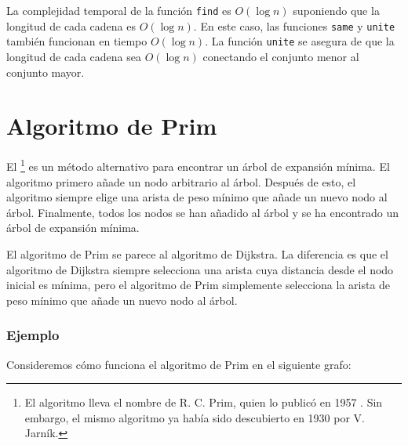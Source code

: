 La complejidad temporal de la función \texttt{find}
es $O(\log n)$ suponiendo que la longitud de cada
cadena es $O(\log n)$.
En este caso, las funciones \texttt{same} y \texttt{unite}
también funcionan en tiempo $O(\log n)$.
La función \texttt{unite} se asegura de que la
longitud de cada cadena sea $O(\log n)$ conectando
el conjunto menor al conjunto mayor.

\section{Algoritmo de Prim}


El \footnote{El algoritmo lleva
el nombre de R. C. Prim, quien lo publicó en 1957 \cite{pri57}.
Sin embargo, el mismo algoritmo ya había sido descubierto en 1930
por V. Jarník.} es un método alternativo
para encontrar un árbol de expansión mínima.
El algoritmo primero añade un nodo arbitrario
al árbol.
Después de esto, el algoritmo siempre elige
una arista de peso mínimo que
añade un nuevo nodo al árbol.
Finalmente, todos los nodos se han añadido al árbol
y se ha encontrado un árbol de expansión mínima.

El algoritmo de Prim se parece al algoritmo de Dijkstra.
La diferencia es que el algoritmo de Dijkstra siempre
selecciona una arista cuya distancia desde el nodo
inicial es mínima, pero el algoritmo de Prim simplemente selecciona
la arista de peso mínimo que añade un nuevo nodo al árbol.

\subsubsection{Ejemplo}

Consideremos cómo funciona el algoritmo de Prim
en el siguiente grafo:

